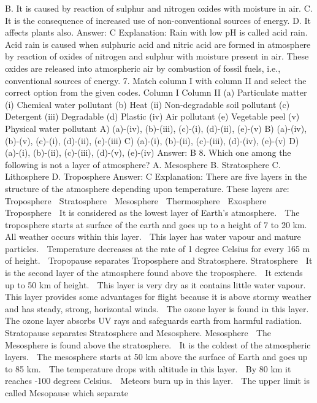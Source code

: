 B. It is caused by reaction of sulphur and nitrogen oxides with
moisture in air.
C. It is the consequence of increased use of non-conventional
sources of energy.
D. It affects plants also.
Answer: C
Explanation: Rain with low pH is called acid rain. Acid rain is caused
when sulphuric acid and nitric acid are formed in atmosphere by
reaction of oxides of nitrogen and sulphur with moisture present in
air. These oxides are released into atmospheric air by combustion of
fossil fuels, i.e., conventional sources of energy.
7. Match column I with column II and select the correct option
from the given codes.
Column I Column II
(a) Particulate matter (i) Chemical water pollutant
(b) Heat (ii) Non-degradable soil pollutant
(c) Detergent (iii) Degradable
(d) Plastic (iv) Air pollutant
(e) Vegetable peel (v) Physical water pollutant
A) (a)-(iv), (b)-(iii), (c)-(i), (d)-(ii), (e)-(v)
B) (a)-(iv), (b)-(v), (c)-(i), (d)-(ii), (e)-(iii)
C) (a)-(i), (b)-(ii), (c)-(iii), (d)-(iv), (e)-(v)
D) (a)-(i), (b)-(ii), (c)-(iii), (d)-(v), (e)-(iv)
Answer: B
8. Which one among the following is not a layer of atmosphere?
A. Mesosphere
B. Stratosphere
C. Lithosphere
D. Troposphere
Answer: C
Explanation: There are five layers in the structure of the
atmosphere depending upon temperature. These layers are:
 Troposphere
 Stratosphere
 Mesosphere
 Thermosphere
 Exosphere
Troposphere
 It is considered as the lowest layer of Earth’s atmosphere.
 The troposphere starts at surface of the earth and goes up to
a height of 7 to 20 km.
 All weather occurs within this layer.
 This layer has water vapour and mature particles.
 Temperature decreases at the rate of 1 degree Celsius for
every 165 m of height.
 Tropopause separates Troposphere and Stratosphere.
Stratosphere
 It is the second layer of the atmosphere found above the
troposphere.
 It extends up to 50 km of height.
 This layer is very dry as it contains little water vapour.
 This layer provides some advantages for flight because it is
above stormy weather and has steady, strong, horizontal winds.
 The ozone layer is found in this layer.
 The ozone layer absorbs UV rays and safeguards earth from
harmful radiation.
 Stratopause separates Stratosphere and Mesosphere.
Mesosphere
 The Mesosphere is found above the stratosphere.
 It is the coldest of the atmospheric layers.
 The mesosphere starts at 50 km above the surface of Earth
and goes up to 85 km.
 The temperature drops with altitude in this layer.
 By 80 km it reaches -100 degrees Celsius.
 Meteors burn up in this layer.
 The upper limit is called Mesopause which separate
